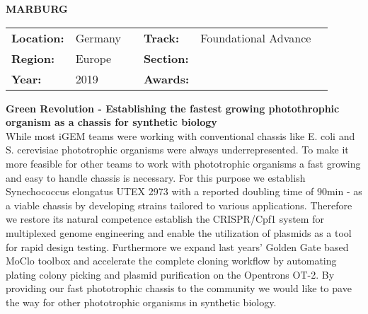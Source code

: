 \textbf{\uppercase{Marburg}} \FloatBarrier \begin{table}[h] \begin{tabular}{lp{2.5cm}llll} \textbf{Location:} & Germany & \multicolumn{1}{|l}{} & \textbf{Track:}   & Foundational Advance \\ \textbf{Region:}   & Europe   & \multicolumn{1}{|l}{} & \textbf{Section:} &  \\ \textbf{Year:}     & 2019   & \multicolumn{1}{|l}{} & \textbf{Awards:}  & \end{tabular} \end{table} \FloatBarrier \noindent\textbf{Green Revolution - Establishing the fastest growing photothrophic organism as a chassis for synthetic biology} \vspace{.2cm}\\ 
While most iGEM teams were working with conventional chassis like E. coli and S. cerevisiae phototrophic organisms were always underrepresented. To make it more feasible for other teams to work with phototrophic organisms a fast growing and easy to handle chassis is necessary. For this purpose we establish Synechococcus elongatus UTEX 2973 with a reported doubling time of 90min - as a viable chassis by developing strains tailored to various applications. Therefore we restore its natural competence establish the CRISPR/Cpf1 system for multiplexed genome engineering and enable the utilization of plasmids as a tool for rapid design testing. Furthermore we expand last years’ Golden Gate based MoClo toolbox and accelerate the complete cloning workflow by automating plating colony picking and plasmid purification on the Opentrons OT-2. By providing our fast phototrophic chassis to the community we would like to pave the way for other phototrophic organisms in synthetic biology.
\vspace{2cm} $ $
\pagebreak

